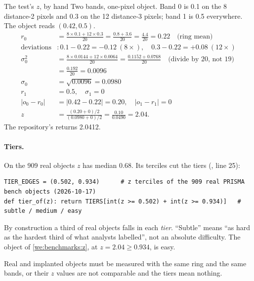 \begin{worked}[label={we:benchmarks:z}]{The test's $z$, by hand}
Two bands, one-pixel object. Band 0 is 0.1 on the 8 distance-2 pixels and 0.3 on the 12 distance-3 pixels; band 1 is
0.5 everywhere. The object reads $(0.42, 0.5)$.
\begin{align*}
r_0 &= \frac{8 \times 0.1 + 12 \times 0.3}{20} = \frac{0.8 + 3.6}{20} = \frac{4.4}{20} = 0.22 \quad \text{(ring mean)}\\
\text{deviations} &: 0.1 - 0.22 = -0.12 \ (8\times), \quad 0.3 - 0.22 = +0.08 \ (12\times)\\
\sigma_0^2 &= \frac{8 \times 0.0144 + 12 \times 0.0064}{20} = \frac{0.1152 + 0.0768}{20} \quad \text{(divide by 20, not 19)}\\
&= \frac{0.192}{20} = 0.0096\\
\sigma_0 &= \sqrt{0.0096} = 0.0980\\
r_1 &= 0.5, \quad \sigma_1 = 0\\
|o_0 - r_0| &= |0.42 - 0.22| = 0.20, \quad |o_1 - r_1| = 0\\
z &= \frac{(0.20 + 0)/2}{(0.0980 + 0)/2} = \frac{0.10}{0.0490} = 2.04.
\end{align*}
The repository's  returns 2.0412\tagC{}.
\end{worked}

\paragraph{Tiers.} On the 909 real objects $z$ has median 0.68. Its terciles cut the tiers
(, line 25):
\begin{lstlisting}[basicstyle=\ttfamily\footnotesize]
TIER_EDGES = (0.502, 0.934)      # z terciles of the 909 real PRISMA bench objects (2026-10-17)
def tier_of(z): return TIERS[int(z >= 0.502) + int(z >= 0.934)]   # subtle / medium / easy
\end{lstlisting}
By construction a third of real objects falls in each \emph{tier}. ``Subtle'' means ``as hard as the
hardest third of what analysts labelled'', not an absolute difficulty. The object of \cref{we:benchmarks:z}, at
$z = 2.04 \ge 0.934$, is easy.

\begin{keypoint}
Real and implanted objects must be measured with the same ring and the same bands, or their $z$ values are not
comparable and the tiers mean nothing.
\end{keypoint}

